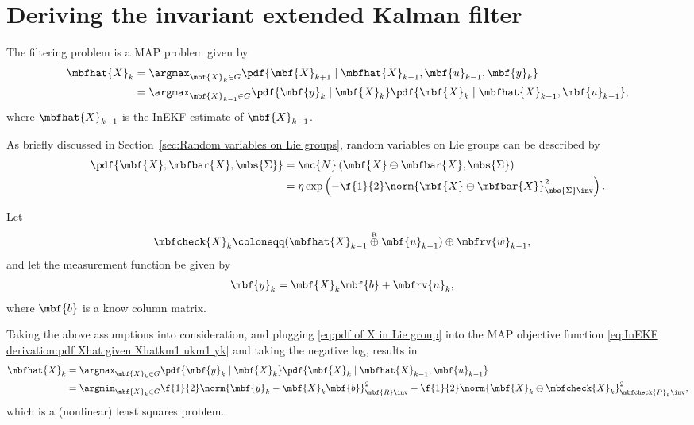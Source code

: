 \section{Deriving the invariant extended Kalman filter}
The filtering problem is a MAP problem given by
\begin{align}
    \mbfhat{X}_{k} 
    &= \argmax_{\mbf{X}_{k}\in G} \pdf{\mbf{X}_{k+1}\mid \mbfhat{X}_{k-1}, \mbf{u}_{k-1}, \mbf{y}_{k}}\\
    \label{eq:InEKF derivation:pdf Xhat given Xhatkm1 ukm1 yk}
    &= \argmax_{\mbf{X}_{k-1}\in G} \pdf{\mbf{y}_{k}\mid \mbf{X}_{k}}\pdf{\mbf{X}_{k}\mid\mbfhat{X}_{k-1}, \mbf{u}_{k-1}},
\end{align}
where $\mbfhat{X}_{k-1}$ is the InEKF estimate of $\mbf{X}_{k-1}$.

As briefly discussed in Section~\ref{sec:Random variables on Lie groups}, random variables on Lie groups can be described by
\begin{align}
    \pdf{\mbf{X}; \mbfbar{X}, \mbs{\Sigma}} &= 
    \mc{N}\left( \mbf{X}\ominus\mbfbar{X}, \mbs{\Sigma} \right)\\
    &=
    \label{eq:pdf of X in Lie group}
    \eta\exp\left(-\f{1}{2}\norm{
        \mbf{X}\ominus\mbfbar{X}
    }_{\mbs{\Sigma}\inv}^{2}\right).
\end{align}

Let
\begin{align}
    \mbfcheck{X}_{k} &\coloneqq (\mbfhat{X}_{k-1}\rplus\mbf{u}_{k-1}) \oplus\mbfrv{w}_{k-1},
\end{align}
and let the measurement function be given by
\begin{align}
    \mbf{y}_{k} &= \mbf{X}_{k}\mbf{b} + \mbfrv{n}_{k},
\end{align}
where $\mbf{b}$ is a know column matrix.

Taking the above assumptions into consideration, and plugging \eqref{eq:pdf of X in Lie group} into the MAP objective function \eqref{eq:InEKF derivation:pdf Xhat given Xhatkm1 ukm1 yk} and taking the negative log, results in
\begin{align}
    \mbfhat{X}_{k} 
    &= \argmax_{\mbf{X}_{k}\in G} \pdf{\mbf{y}_{k}\mid \mbf{X}_{k}}\pdf{\mbf{X}_{k}\mid\mbfhat{X}_{k-1}, \mbf{u}_{k-1}}\\
    &= \argmin_{\mbf{X}_{k}\in G} \f{1}{2}\norm{\mbf{y}_{k} - \mbf{X}_{k}\mbf{b}}^{2}_{\mbf{R}\inv} 
    + \f{1}{2}\norm{
        \mbf{X}_{k}\ominus\mbfcheck{X}_{k}
    }^{2}_{\mbfcheck{P}_{k}\inv},
\end{align}
which is a (nonlinear) least squares problem.


